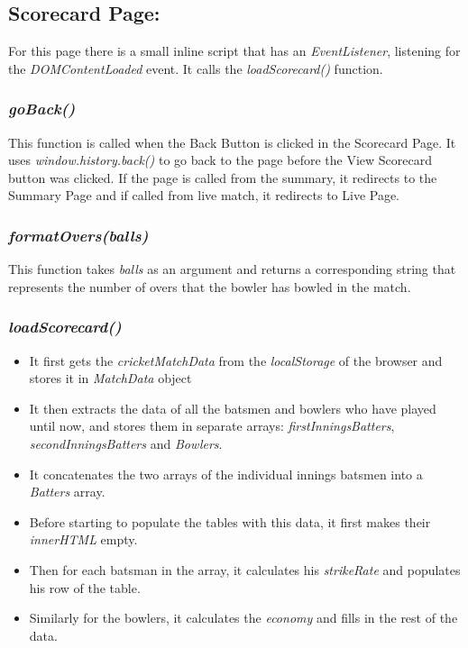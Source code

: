 \documentclass[a4paper,12pt]{article}
\begin{document}
\subsection{Scorecard Page:}
For this page there is a small inline script that has an \textit{EventListener}, listening for the \textit{DOMContentLoaded} event.
It calls the \textit{loadScorecard()} function.
\subsubsection{\textit{goBack()}}
This function is called when the Back Button is clicked in the Scorecard Page.
It uses \textit{window.history.back()} to go back to the page before the View Scorecard button was clicked.
If the page is called from the summary, it redirects to the Summary Page and if called from live match, it redirects to Live Page.

\subsubsection{\textit{formatOvers(balls)}}
This function takes \textit{balls} as an argument and returns a corresponding string that represents the number of overs that the bowler has bowled in the match.

\subsubsection{\textit{loadScorecard()}}
\begin{itemize}
\item It first gets the \textit{cricketMatchData} from the \textit{localStorage} of the browser and stores it in \textit{MatchData} object
\item It then extracts the data of all the batsmen and bowlers who have played until now, and stores them in separate arrays: \textit{firstInningsBatters}, \textit{secondInningsBatters} and \textit{Bowlers}.
\item It concatenates the two arrays of the individual innings batsmen into a \textit{Batters} array.
\item Before starting to populate the tables with this data, it first makes their \textit{innerHTML} empty.
\item Then for each batsman in the array, it calculates his \textit{strikeRate} and populates his row of the table.
\item Similarly for the bowlers, it calculates the \textit{economy} and fills in the rest of the data. 
\end{itemize}
\end{document}
